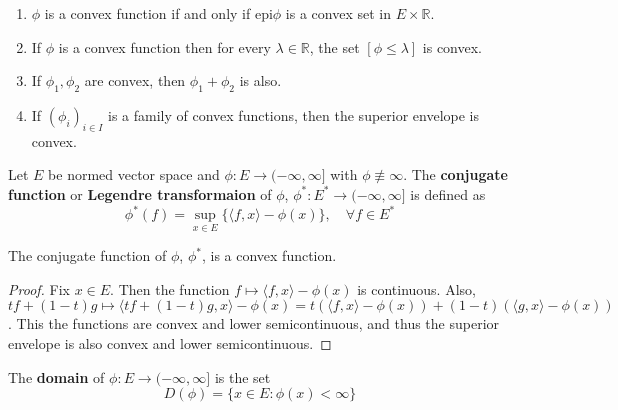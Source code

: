 \begin{prop}
\begin{enumerate}
\item $\phi$ is a convex function if and only if $\textrm{epi}\phi$ is a convex set in $E\times \mathbb{R}$.
\item If $\phi$ is a convex function then for every $\lambda\in \mathbb{R}$, the set $[\phi\leq \lambda]$ is convex.
\item If $\phi_1,\phi_2$ are convex, then $\phi_1+\phi_2$ is also.
\item If $(\phi_i)_{i\in I}$ is a family of convex functions, then the superior envelope is convex.
\end{enumerate}
\end{prop}

\begin{defn} Let $E$ be normed vector space and $\phi:E\rightarrow (-\infty,\infty]$ with $\phi\not\equiv \infty$. The \textbf{conjugate function} or \textbf{Legendre transformaion} of $\phi$, $\phi^*:E^*\rightarrow (-\infty,\infty]$ is defined as
\begin{equation}
\phi^*(f)=\sup_{x\in E}\{\langle f,x\rangle-\phi(x)\},\quad \forall f\in E^*
\end{equation}
\end{defn}

\begin{prop} The conjugate function of $\phi$, $\phi^*$, is a convex function.
\end{prop}
\begin{proof}
Fix $x\in E$. Then the function $f\mapsto \langle f,x\rangle-\phi(x)$ is continuous. Also, $tf+(1-t)g\mapsto \langle tf+(1-t)g,x\rangle-\phi(x)=t(\langle f,x\rangle-\phi(x))+(1-t)(\langle g,x\rangle-\phi(x))$. This the functions are convex and lower semicontinuous, and thus the superior envelope is also convex and lower semicontinuous.
\end{proof}

\begin{defn} The \textbf{domain} of $\phi:E\rightarrow(-\infty,\infty]$ is the set
\begin{equation}
D(\phi)=\{x\in E:\phi(x)<\infty\}
\end{equation}
\end{defn}

